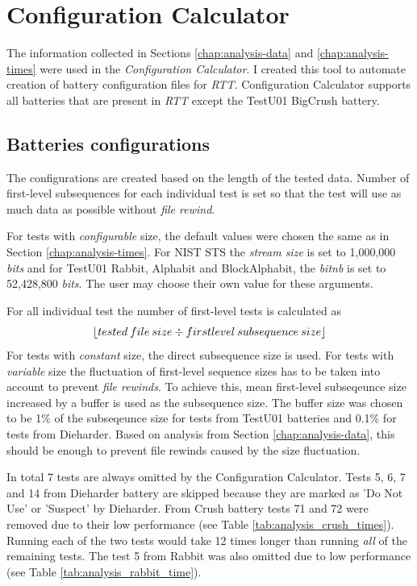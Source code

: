 \documentclass[
  digital,     %
  oneside,     %
  nosansbold,  %
  nocolorbold, %
  nolof,         %
  nolot,         %
]{fithesis4}
\begin{document}

\section{Configuration Calculator} \label{chap:analysis-config-calc}

The information collected in Sections \ref{chap:analysis-data} and \ref{chap:analysis-times} were used in the \emph{Configuration Calculator}. I created this tool to automate creation of battery configuration files for \emph{RTT}. Configuration Calculator supports all batteries that are present in \emph{RTT} except the TestU01 BigCrush battery.

\subsection{Batteries configurations}

The configurations are created based on the length of the tested data. Number of first-level subsequences for each individual test is set so that the test will use as much data as possible without \emph{file rewind}.

For tests with \emph{configurable} size, the default values were chosen the same as in Section \ref{chap:analysis-times}. For NIST STS the \emph{stream size} is set to 1,000,000 \emph{bits} and for TestU01 Rabbit, Alphabit and BlockAlphabit, the \emph{bit\textunderscore nb} is set to  52,428,800 \emph{bits}. The user may choose their own value for these arguments.

For all individual test the number of first-level tests is calculated as 
$$\lfloor tested\:file\:size \div first\-level\:subsequence\:size\rfloor$$
For tests with \emph{constant} size, the direct subsequence size is used. For tests with \emph{variable} size the fluctuation of first-level sequence sizes has to be taken into account to prevent \emph{file rewinds}. To achieve this, mean first-level subseqeunce size increased by a buffer is used as the subsequence size. The buffer size was chosen to be 1\% of the subseqeunce size for tests from TestU01 batteries and 0.1\% for tests from Dieharder. Based on analysis from Section \ref{chap:analysis-data}, this should be enough to prevent file rewinds caused by the size fluctuation.

In total 7 tests are always omitted by the Configuration Calculator. Tests 5, 6, 7 and 14 from Dieharder battery are skipped because they are marked as 'Do Not Use' or 'Suspect' by Dieharder. From Crush battery tests 71 and 72 were removed due to their low performance (see Table \ref{tab:analysis_crush_times}). Running each of the two tests would take 12 times longer than running \emph{all} of the remaining tests. The test 5 from Rabbit was also omitted due to low performance (see Table \ref{tab:analysis_rabbit_time}).
\end{document}
